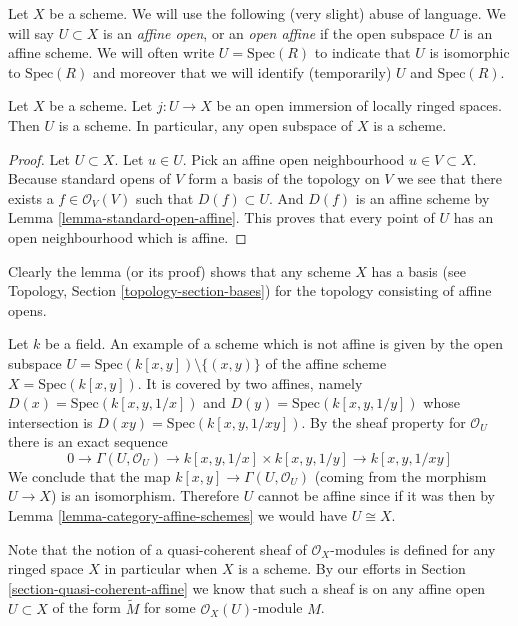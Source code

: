 \noindent
Let $X$ be a scheme.
We will use the following (very slight) abuse of language.
We will say $U \subset X$ is an {\it affine open}, or an {\it open affine}
if the open subspace $U$ is an affine scheme. We will often
write $U = \text{Spec}(R)$ to indicate that $U$ is isomorphic
to $\text{Spec}(R)$ and moreover that we will identify (temporarily)
$U$ and $\text{Spec}(R)$.

\begin{lemma}
\label{lemma-open-subspace-scheme}
Let $X$ be a scheme. Let $j : U \to X$ be an open immersion
of locally ringed spaces. Then $U$ is a scheme. In particular,
any open subspace of $X$ is a scheme.
\end{lemma}

\begin{proof}
Let $U \subset X$. Let $u \in U$.
Pick an affine open neighbourhood $u \in V \subset X$.
Because standard opens of $V$ form a basis of the topology
on $V$ we see that there exists a $f\in \mathcal{O}_V(V)$
such that $D(f) \subset U$. And $D(f)$ is an affine scheme
by Lemma \ref{lemma-standard-open-affine}. This proves that every point
of $U$ has an open neighbourhood which is affine.
\end{proof}

\noindent
Clearly the lemma (or its proof) shows that any scheme
$X$ has a basis (see Topology, Section \ref{topology-section-bases})
for the topology consisting of affine opens. 

\begin{example}
\label{example-not-affine}
Let $k$ be a field.
An example of a scheme which is not affine is
given by the open subspace
$U = \text{Spec}(k[x, y]) \setminus \{ (x, y)\}$
of the affine scheme $X =\text{Spec}(k[x, y])$.
It is covered by two affines, namely $D(x) = \text{Spec}(k[x,y,1/x])$
and $D(y) = \text{Spec}(k[x,y,1/y])$ whose intersection is
$D(xy) = \text{Spec}(k[x,y,1/xy])$. By the sheaf property
for $\mathcal{O}_U$ there is an exact sequence
$$
0 \to
\Gamma(U, \mathcal{O}_U) \to
k[x, y, 1/x] \times k[x,y, 1/y] \to
k[x, y, 1/xy]
$$
We conclude that the map $k[x, y] \to \Gamma(U, \mathcal{O}_U)$
(coming from the morphism $U \to X$) is an isomorphism.
Therefore $U$ cannot be affine since if it was then by
Lemma \ref{lemma-category-affine-schemes} we would have $U \cong X$.
\end{example}

\noindent
Note that the notion of a quasi-coherent sheaf of $\mathcal{O}_X$-modules
is defined for any ringed space $X$ in particular when $X$ is a scheme.
By our efforts in Section \ref{section-quasi-coherent-affine} we
know that such a sheaf is on any affine open $U \subset X$
of the form $\widetilde M$ for some $\mathcal{O}_X(U)$-module $M$.

